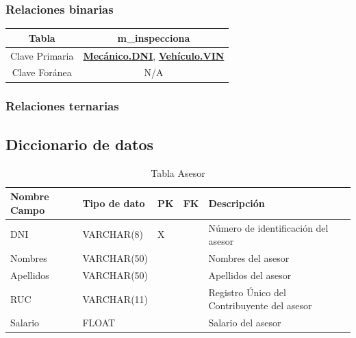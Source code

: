 \documentclass[12pt]{article}
\begin{document}
\subsubsection{Relaciones binarias}

\begin{tabular}{|c|c|}
\hline
Tabla & m\_inspecciona \\
\hline
Clave Primaria & \textbf{\underline{Mecánico.DNI}}, \textbf{\underline{Vehículo.VIN}} \\
\hline
Clave Foránea & N/A \\
\hline
\end{tabular}

\subsubsection{Relaciones ternarias}

\subsection{Diccionario de datos}

\begin{table}[htbp]
    \begin{center}
    \begin{tabular}{|l|l|l|l|l|}
        \hline
        Nombre Campo & Tipo de dato & PK & FK & Descripción \\
        \hline
        DNI & VARCHAR(8) & X &  & Número de identificación del asesor \\
        Nombres & VARCHAR(50) &  &  & Nombres del asesor \\
        Apellidos & VARCHAR(50) &  &  & Apellidos del asesor \\
        RUC & VARCHAR(11) &  &  & Registro Único del Contribuyente del asesor \\
        Salario & FLOAT &  &  & Salario del asesor \\
        \hline
        \end{tabular}
        \caption{Tabla Asesor}
        \label{tab:tablas}
    \end{center}
\end{table}
\end{document}
